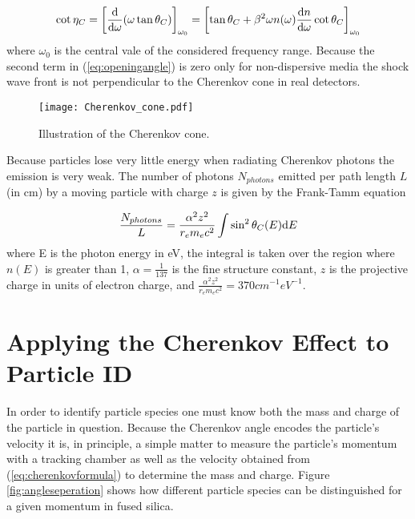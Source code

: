 \begin{equation}
	\cot\eta_C = \left[\frac{\mathrm{d}}{\mathrm{d}\omega}(\omega \tan\theta_{C}) \right]_{\omega_0} = \left[\tan\theta_{C} + \beta^2\omega n(\omega) \frac{\mathrm{d} n}{\mathrm{d}\omega}\cot\theta_{C} \right]_{\omega_0}
	\label{eq:openingangle}
\end{equation}
where $\omega_0$ is the central vale of the considered frequency range. Because the second term in (\ref{eq:openingangle}) is zero only for non-dispersive media the shock wave front is not perpendicular to the Cherenkov cone in real detectors.

\begin{figure}[!htb]
	\centering
	\texttt{[image: Cherenkov\_cone.pdf]}
	\caption{Illustration of the Cherenkov cone.}
	\label{fig:cherenkovcone}
\end{figure}

Because particles lose very little energy when radiating Cherenkov photons the emission is very weak. The number of photons $N_{photons}$ emitted per path length $L$ (in cm) by a moving particle with charge $z$ is given by the Frank-Tamm equation

\begin{equation}
	\frac{N_{photons}}{L} = \frac{\alpha^2 z^2}{r_e m_e c^2} \int \sin^2\theta_{C} (E) \mathrm{d} E
	\label{eq:nphotons}
\end{equation}
where E is the photon energy in eV, the integral is taken over the region where $n(E)$ is greater than 1, $\alpha = \frac{1}{137}$ is the fine structure constant, $z$ is the projective charge in units of electron charge, and $\frac{\alpha^2 z^2}{r_e m_e c^2} = 370\unit{cm}^{-1}\unit{eV}^{-1}$.

\section{Applying the Cherenkov Effect to Particle ID}
In order to identify particle species one must know both the mass and charge of the particle in question. Because the Cherenkov angle encodes the particle's velocity it is, in principle, a simple matter to measure the particle's momentum with a tracking chamber as well as the velocity obtained from (\ref{eq:cherenkovformula}) to determine the mass and charge. Figure \ref{fig:angleseperation} shows how different particle species can be distinguished for a given momentum in fused silica.

